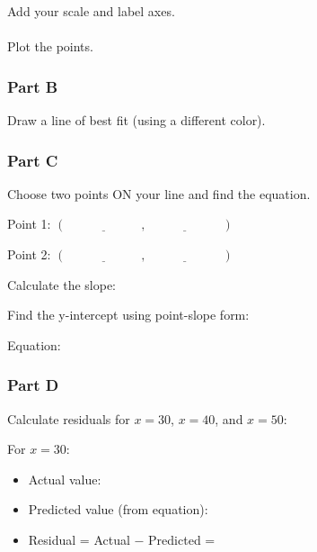 \documentclass[12pt]{article}
\begin{document}
				Add your scale and label axes.\\\\
				Plot the points.

				\vspace{8cm}

			\subsubsection*{Part B}
				
				Draw a line of best fit (using a different color).

				\newpage

			\subsubsection*{Part C}
				
				Choose two points ON your line and find the equation.

				Point 1: $(\underline{\hspace{1in}}, \underline{\hspace{1in}})$

				Point 2: $(\underline{\hspace{1in}}, \underline{\hspace{1in}})$

				Calculate the slope:

				\vspace{2cm}

				Find the y-intercept using point-slope form:

				\vspace{2cm}

				Equation: \underline{\hspace{3in}}

			\subsubsection*{Part D}
			
				Calculate residuals for $x = 30$, $x = 40$, and $x = 50$:

				For $x = 30$:
				\begin{itemize}
					\item Actual value: \underline{\hspace{1in}}
					\item Predicted value (from equation): \underline{\hspace{1in}}
					\item Residual = Actual $-$ Predicted = \underline{\hspace{1in}}
				\end{itemize}
\end{document}
